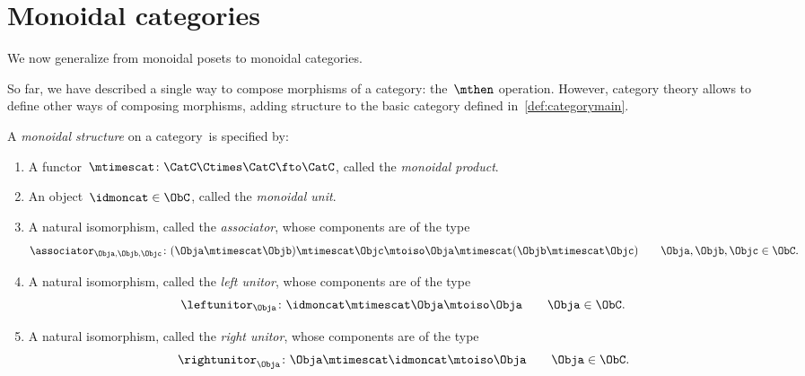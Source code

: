 
\section{Monoidal categories}
\label{sec:parallelism-mon-cat}

We now generalize from monoidal posets to monoidal categories.

So far, we have described a single way to compose morphisms of a category: the~$\mthen$ operation.
However, category theory allows to define other ways of composing morphisms, adding structure to the basic category defined in~\cref{def:categorymain}.

\begin{ctdefinition}
	\label{def:monoidal-cat}
	A \emph{monoidal structure} on a category~\CatC is specified by:

	\constit
	\begin{enumerate}
		\item A functor~$\mtimescat \colon \CatC \Ctimes \CatC\fto \CatC$, called the \emph{monoidal product}.
		\item An object~$\idmoncat \in \ObC$, called the \emph{monoidal unit}.
		\item A natural isomorphism, called the \emph{associator}, whose components are of the type
		      \begin{equation*}
			      \associator_{\Obja,\Objb,\Objc}\colon (\Obja \mtimescat \Objb )\mtimescat \Objc \mtoiso \Obja\mtimescat (\Objb \mtimescat \Objc) \quad \quad \Obja,\Objb,\Objc\in \ObC.
		      \end{equation*}
		\item A natural isomorphism, called the \emph{left unitor}, whose components are of the type
		      \begin{equation*}
			      \leftunitor_\Obja \colon \idmoncat\mtimescat \Obja \mtoiso \Obja \quad \quad \Obja\in \ObC.
		      \end{equation*}
		\item A natural isomorphism, called the \emph{right unitor}, whose components are of the type
		      \begin{equation*}
			      \rightunitor_\Obja \colon \Obja \mtimescat \idmoncat \mtoiso \Obja \quad \quad \Obja\in \ObC.
		      \end{equation*}
	\end{enumerate}


\end{ctdefinition}
